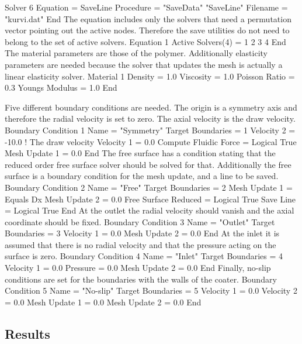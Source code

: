 Solver 6
  Equation = SaveLine
  Procedure = "SaveData" "SaveLine"
  Filename = "kurvi.dat"
End
\ttend
%
The equation includes only the solvers that need a permutation vector 
pointing out the active nodes. Therefore the save utilities do not need to belong
to the set of active solvers.
\ttbegin
Equation 1
  Active Solvers(4) = 1 2 3 4
End
\ttend
%
The material parameters are those of the polymer. Additionally elasticity 
parameters are needed because the solver that updates the mesh is actually
a linear elasticity solver.
\ttbegin
Material 1
  Density = 1.0
  Viscosity = 1.0
  Poisson Ratio = 0.3
  Youngs Modulus = 1.0
End
\ttend

Five different boundary conditions are needed.
The origin is a symmetry axis and therefore the radial velocity is 
set to zero. The axial velocity is the draw velocity.
\ttbegin
Boundary Condition 1
  Name = "Symmetry"
  Target Boundaries = 1
  Velocity 2 = -10.0     ! The draw velocity
  Velocity 1 = 0.0
  Compute Fluidic Force = Logical True
  Mesh Update 1 = 0.0
End
\ttend
%
The free surface has a condition stating that the reduced order free 
surface solver should be solved for that. Additionally the 
free surface is a boundary condition for the mesh update,
and a line to be saved.
\ttbegin
Boundary Condition 2
  Name = "Free"
  Target Boundaries = 2
  Mesh Update 1 = Equals Dx
  Mesh Update 2 = 0.0
  Free Surface Reduced = Logical True
  Save Line = Logical True
End
\ttend
%
At the outlet the radial velocity should vanish and the axial coordinate should
be fixed.
\ttbegin
Boundary Condition 3
  Name = "Outlet"
  Target Boundaries = 3
  Velocity 1 = 0.0
  Mesh Update 2 = 0.0
End
\ttend
%
At the inlet it is assumed that there is no radial velocity and that 
the pressure acting on the surface is zero.
\ttbegin
Boundary Condition 4
  Name = "Inlet"
  Target Boundaries = 4
  Velocity 1 = 0.0
  Pressure = 0.0
  Mesh Update 2 = 0.0
End
\ttend
%
Finally, no-slip conditions are set for the boundaries with the walls of the
coater.
\ttbegin
Boundary Condition 5
  Name = "No-slip"
  Target Boundaries = 5
  Velocity 1 = 0.0
  Velocity 2 = 0.0
  Mesh Update 1 = 0.0
  Mesh Update 2 = 0.0
End
\ttend


\subsection*{Results}

